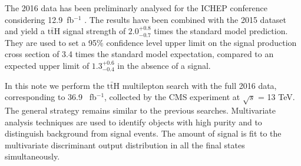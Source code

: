 The 2016 data has been preliminarly analysed for the ICHEP conference considering 12.9~fb$^{-1}$ \cite{cms_multilepton_2016ICHEP}.
The results have been combined with the 2015 dataset and yield
a $\mathrm{t \bar t H}$ signal strength of $2.0_{-0.7}^{+0.8}$ times the standard model prediction.
They are used to set a 95\% confidence level upper limit on the signal production cross section of 3.4
times the standard model expectation, compared to an expected upper limit of $1.3_{-0.4}^{+0.6}$ in the absence of a signal.

In this note we perform the $\mathrm{t \bar t H}$ multilepton search with the full 2016 data, corresponding to 36.9 ~fb$^{-1}$,
collected by the CMS experiment at $\sqrt{s}$ = 13 TeV.
The general strategy remains similar to the previous searches.
Multivariate analysis techniques are used to identify objects with high purity and
to distinguish background from signal events.
The amount of signal is fit to the multivariate discriminant output distribution in all the final states simultaneously. \\

